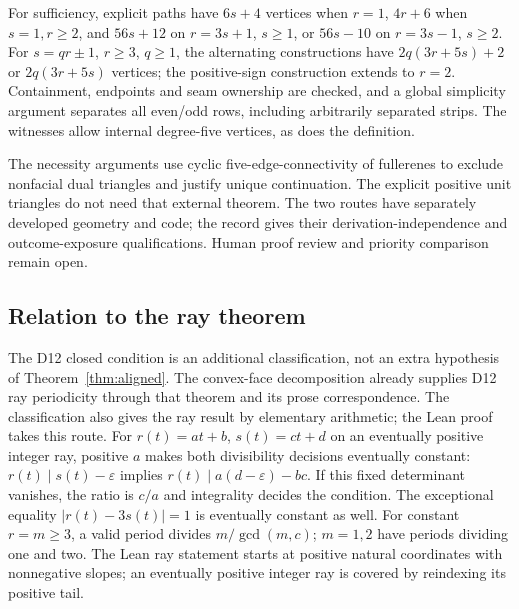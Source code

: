 \documentclass[11pt]{amsart}
\theoremstyle{definition}\newtheorem{definition}{Definition}
\begin{document}
For sufficiency, explicit paths have $6s+4$ vertices when $r=1$,
$4r+6$ when $s=1,r\ge2$, and $56s+12$ on $r=3s+1$, $s\ge1$,
or $56s-10$ on $r=3s-1$, $s\ge2$. For $s=qr\pm1$, $r\ge3$,
$q\ge1$, the alternating constructions have
$2q(3r+5s)+2$ or $2q(3r+5s)$ vertices; the positive-sign
construction extends to $r=2$. Containment, endpoints and seam
ownership are checked, and a global simplicity argument separates
all even/odd rows, including arbitrarily separated strips.
The witnesses allow internal degree-five vertices, as does the definition.

The necessity arguments use cyclic five-edge-connectivity of fullerenes
\cite{Connectivity} to exclude nonfacial dual triangles and justify
unique continuation. The explicit positive unit triangles do not need
that external theorem. The two routes have separately developed
geometry and code; the record gives their derivation-independence and
outcome-exposure qualifications. Human proof review and priority
comparison remain open.

\subsection{Relation to the ray theorem}
The D12 closed condition is an additional classification, not an extra
hypothesis of Theorem~\ref{thm:aligned}. The convex-face decomposition
already supplies D12 ray periodicity through that theorem and its
prose correspondence. The classification also gives the ray result by
elementary arithmetic; the Lean proof takes this route. For
$r(t)=at+b$, $s(t)=ct+d$ on an eventually positive integer ray,
positive $a$ makes both divisibility decisions eventually constant:
$r(t)\mid s(t)-\varepsilon$ implies
$r(t)\mid a(d-\varepsilon)-bc$. If this fixed determinant vanishes,
the ratio is $c/a$ and integrality decides the condition. The
exceptional equality $|r(t)-3s(t)|=1$ is eventually constant as well.
For constant $r=m\ge3$, a valid period divides $m/\gcd(m,c)$;
$m=1,2$ have periods dividing one and two. The Lean ray statement starts at
positive natural coordinates with nonnegative slopes; an eventually
positive integer ray is covered by reindexing its positive tail.

\appendix
\end{document}
